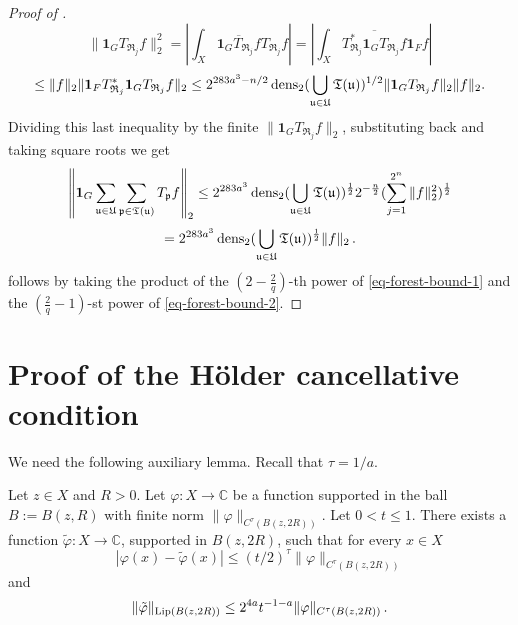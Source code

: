 \begin{proof}[Proof of ]
    $$
        \| \mathbf{1}_G T_{\mathfrak{R}_j} f \|_2^2 = \left| \int_X \overline{\mathbf{1}_G T_{\mathfrak{R}_j} f} T_{\mathfrak{R}_j} f \right| = \left| \int_X \overline{T_{\mathfrak{R}_j}^* \mathbf{1}_G T_{\mathfrak{R}_j} f} \mathbf{1}_F f \right|
    $$
    $$
        \le \|f\|_2 \| \mathbf{1}_F T_{\mathfrak{R}_j}^* \mathbf{1}_G T_{\mathfrak{R}_j} f \|_2 \le 2^{283a^3-n/2} \operatorname{\operatorname{dens}}_2(\bigcup_{{\mathfrak u}\in {\mathfrak U}}{\mathfrak T}({\mathfrak u}))^{1/2} \| \mathbf{1}_G T_{\mathfrak{R}_j} f \|_2 \|f\|_2.
    $$
    Dividing this last inequality by the finite $\| \mathbf{1}_G T_{\mathfrak{R}_j} f \|_2$, substituting back and taking square roots we get
    $$
        \left\|\mathbf{1}_G \sum_{{\mathfrak u} \in {\mathfrak U}} \sum_{{\mathfrak p} \in {\mathfrak T}({\mathfrak u})} T_{{\mathfrak p}} f\right\|_2 \le 2^{283a^3} \operatorname{\operatorname{dens}}_2(\bigcup_{{\mathfrak u}\in {\mathfrak U}}{\mathfrak T}({\mathfrak u}))^{\frac{1}{2}} 2^{-\frac{n}{2}} (\sum_{j = 1}^{2^n} \|f\|_2^2)^{\frac{1}{2}}
    $$
    \begin{equation}
        \label{eq-forest-bound-2}
        = 2^{283a^3} \operatorname{\operatorname{dens}}_2(\bigcup_{{\mathfrak u}\in {\mathfrak U}}{\mathfrak T}({\mathfrak u}))^{\frac{1}{2}} \|f\|_2\,.
    \end{equation}
     follows by taking the product of the $(2 - \frac{2}{q})$-th power of \eqref{eq-forest-bound-1} and the $(\frac{2}{q} - 1)$-st power of \eqref{eq-forest-bound-2}.
\end{proof}

\section{Proof of the H\"older cancellative condition}
\label{liphoel}

We need the following auxiliary lemma.
Recall that $\tau = 1/a$.

\begin{lemma}
    \label{Lipschitz-Holder-approximation}
    \leanok
    Let $z\in X$ and $R>0$. Let $\varphi: X \to \mathbb{C}$ be a function supported in the ball
    $B:=B(z,R)$ with finite norm $\|\varphi\|_{C^\tau(B(z, 2R))}$.
    Let $0<t \leq 1$. There exists a function $\tilde \varphi : X \to \mathbb{C}$, supported in $B(z,2R)$, such that for every $x\in X$
    \begin{equation}\label{eq-firstt}
        |\varphi(x) - \tilde \varphi(x)| \leq (t/2)^{\tau} \|\varphi\|_{C^\tau(B(z,2R))}
    \end{equation}and
   \begin{equation}\label{eq-secondt}
       \|\tilde \varphi\|_{\operatorname{\operatorname{Lip}}(B(z,2R))} \leq 2^{4a}t^{-1-a} \|\varphi\|_{C^{\tau}(B(z,2R))}\, .
   \end{equation}
\end{lemma}


